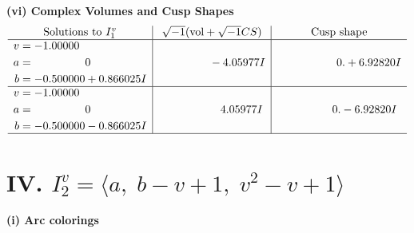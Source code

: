 \documentclass[1p]{elsarticle_modified}
\theoremstyle{definition}
\newcommand{\I}{\sqrt{-1}}
\begin{document}
\newpage\flushleft \textbf{(vi) Complex Volumes and Cusp Shapes}
$$\begin{array}{c|c|c}  
\text{Solutions to }I^v_{1}& \I (\text{vol} + \sqrt{-1}CS) & \text{Cusp shape}\\
 \hline 
\begin{aligned}
v &= -1.00000\phantom{ +0.000000I} \\
a &= \phantom{-0.000000 } 0 \\
b &= -0.500000 + 0.866025 I\end{aligned}
 & \phantom{-0.000000 } -4.05977 I & \phantom{-0.000000 -}0. + 6.92820 I \\ \hline\begin{aligned}
v &= -1.00000\phantom{ +0.000000I} \\
a &= \phantom{-0.000000 } 0 \\
b &= -0.500000 - 0.866025 I\end{aligned}
 & \phantom{-0.000000 -}4.05977 I & \phantom{-0.000000 } 0. - 6.92820 I\\
 \hline 
 \end{array}$$\newpage\newpage\renewcommand{\arraystretch}{1}
\centering \section*{IV. $I^v_{2}= \langle a,\;b- v+1,\;v^2- v+1 \rangle$}
\flushleft \textbf{(i) Arc colorings}\\
\end{document}
